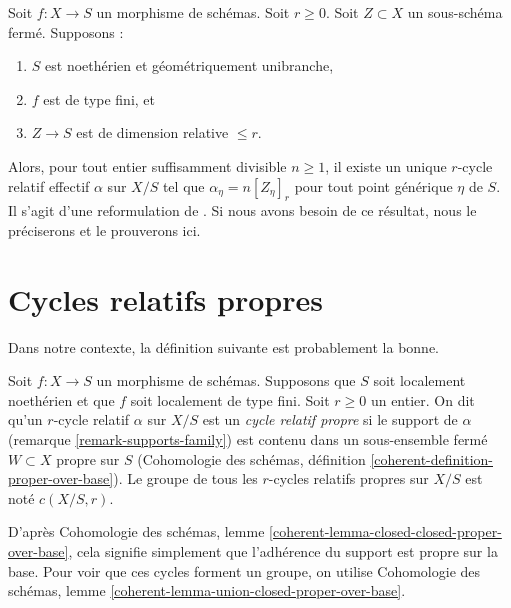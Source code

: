 \begin{remark} 
\label{remark-equidimensional-over-geometrically-unibranch} 
Soit  $f : X \to S$  un morphisme de schémas. Soit  $r \geq 0$. Soit  $Z \subset X$
  un sous-schéma fermé. Supposons : 
\begin{enumerate} 
\item $S$  est noethérien et géométriquement unibranche, 
\item $f$  est de type fini, et 
\item $Z \to S$  est de dimension relative  $\leq r$. 
\end{enumerate} 
Alors, pour tout entier suffisamment divisible $n \geq 1$, il 
existe un unique $r$-cycle relatif effectif $\alpha$ sur $X/S$ tel que 
$\alpha_\eta = n[Z_\eta]_r$ pour tout point générique $\eta$  de  $S$.
 Il s'agit d'une reformulation de  \cite[théorème 3.4.2]{SV}. 
Si nous avons besoin de ce résultat, nous le préciserons et le prouverons ici. 
\end{remark} 











\section{Cycles relatifs propres} 
\label{section-proper} 

\noindent
 Dans notre contexte, la définition suivante est probablement la bonne. 

\begin{definition} 
\label{definition-proper} 
Soit  $f : X \to S$  un morphisme de schémas. Supposons que  $S$  soit localement noethérien et
 que  $f$  soit localement de type fini. Soit $r \geq 0$  un entier. On dit 
qu'un  $r$-cycle relatif  $\alpha$  sur $X/S$  est un  {\it  cycle relatif propre} 
 si le support de  $\alpha$  (remarque \ref{remark-supports-family}) est
 contenu dans un sous-ensemble fermé  $W \subset X$  propre sur  $S$
  (Cohomologie des schémas, définition \ref{coherent-definition-proper-over-base}).
 Le groupe de tous les  $r$-cycles relatifs propres sur  $X/S$  
est noté  $c(X/S, r)$. 
\end{definition} 

\noindent
 D'après Cohomologie des schémas, lemme 
\ref{coherent-lemma-closed-closed-proper-over-base}, cela 
signifie simplement que l'adhérence du support est propre sur la base. Pour voir que
 ces cycles forment un groupe, on utilise
 Cohomologie des schémas, lemme \ref{coherent-lemma-union-closed-proper-over-base}. 


